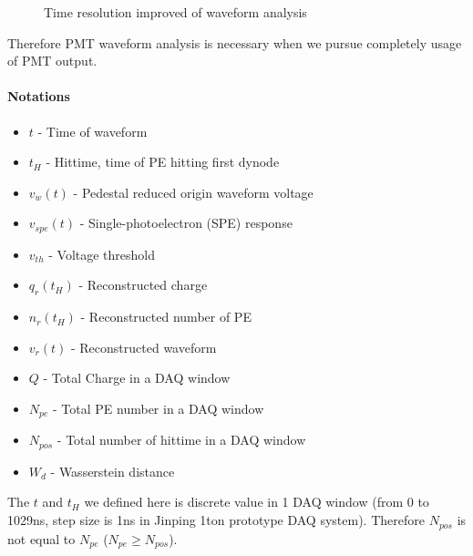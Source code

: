 \begin{minipage}{1.0\textwidth}
\begin{figure}[H]    
    \centering
    \scalebox{0.35}{}
    \caption{\label{fig:reso-diff} Time resolution improved of waveform analysis}
\end{figure}
\end{minipage}

Therefore PMT waveform analysis is necessary when we pursue completely usage of PMT output. 

\paragraph{Notations}
\begin{itemize}
    \item $t$ - Time of waveform
    \item $t_{H}$ - Hittime, time of PE hitting first dynode
    \item $v_{w}(t)$ - Pedestal reduced origin waveform voltage
    \item $v_{spe}(t)$ - Single-photoelectron (SPE) response
    \item $v_{th}$ - Voltage threshold
    \item $q_{r}(t_{H})$ - Reconstructed charge
    \item $n_{r}(t_{H})$ - Reconstructed number of PE
    \item $v_{r}(t)$ - Reconstructed waveform
    \item $Q$ - Total Charge in a DAQ window
    \item $N_{pe}$ - Total PE number in a DAQ window
    \item $N_{pos}$ - Total number of hittime in a DAQ window
    \item $W_{d}$ - Wasserstein distance
\end{itemize}
The $t$ and $t_{H}$ we defined here is discrete value in 1 DAQ window (from 0 to 1029ns, step size is 1ns in Jinping 1ton prototype DAQ system). Therefore $N_{pos}$ is not equal to $N_{pe}$ ($N_{pe} \geq N_{pos}$). 
